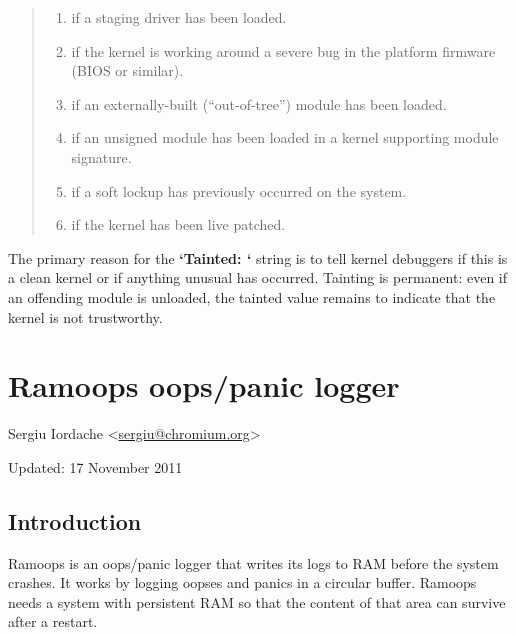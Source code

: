 \documentclass[a4paper,8pt,english]{sphinxmanual}
\begin{document}
\begin{quote}
\begin{enumerate}
\item {} 
 if a staging driver has been loaded.

\item {} 
 if the kernel is working around a severe bug in the platform
firmware (BIOS or similar).

\item {} 
 if an externally-built (``out-of-tree'') module has been loaded.

\item {} 
 if an unsigned module has been loaded in a kernel supporting
module signature.

\item {} 
 if a soft lockup has previously occurred on the system.

\item {} 
 if the kernel has been live patched.

\end{enumerate}
\end{quote}

The primary reason for the \textbf{`Tainted: `} string is to tell kernel
debuggers if this is a clean kernel or if anything unusual has
occurred.  Tainting is permanent: even if an offending module is
unloaded, the tainted value remains to indicate that the kernel is not
trustworthy.


\chapter{Ramoops oops/panic logger}
\label{admin-guide/ramoops::doc}\label{admin-guide/ramoops:ramoops-oops-panic-logger}
Sergiu Iordache \textless{}\href{mailto:sergiu@chromium.org}{sergiu@chromium.org}\textgreater{}

Updated: 17 November 2011


\section{Introduction}
\label{admin-guide/ramoops:introduction}
Ramoops is an oops/panic logger that writes its logs to RAM before the system
crashes. It works by logging oopses and panics in a circular buffer. Ramoops
needs a system with persistent RAM so that the content of that area can
survive after a restart.
\end{document}
